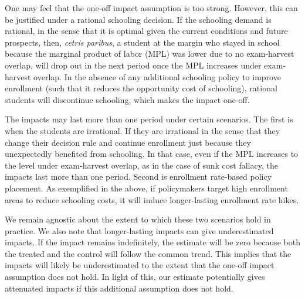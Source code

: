 \documentclass[12pt,letterpaper]{article}
\newcommand{\0}{\ensuremath{\mbox{\boldmath $0$}}}
\begin{document}
One may feel that the one-off impact assumption is too strong. However, this can be justified under a rational schooling decision. If the schooling demand is rational, in the sense that it is optimal given the current conditions and future prospects, then, \textit{cetris paribus}, a student at the margin who stayed in school because the marginal product of labor (MPL) was lower due to no exam-harvest overlap, will drop out in the next period once the MPL increases under exam-harvest overlap. In the absence of any additional schooling policy to improve enrollment (such that it reduces the opportunity cost of schooling), rational students will discontinue schooling, which makes the impact one-off. 

The impacts may last more than one period under certain scenarios. The first is when the students are irrational. If they are irrational in the sense that they change their decision rule and continue enrollment just because they unexpectedly benefited from schooling. In that case, even if the MPL increases to the level under exam-harvest overlap, as in the case of sunk cost fallacy, the impacts last more than one period. Second is enrollment rate-based policy placement. As exemplified in the above, if policymakers target high enrollment areas to reduce schooling costs, it will induce longer-lasting enrollment rate hikes. 

We remain agnostic about the extent to which these two scenarios hold in practice. We also note that longer-lasting impacts can give underestimated impacts. If the impact remains indefinitely, the estimate will be zero because both the treated and the control will follow the common trend. This implies that the impacts will likely be underestimated to the extent that the one-off impact assumption does not hold. In light of this, our estimate potentially gives attenuated impacts if this additional assumption does not hold.

\end{document}
